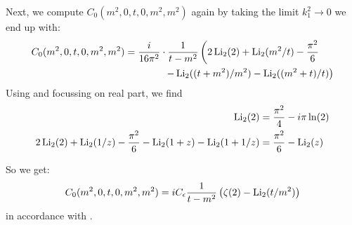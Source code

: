 Next, we compute $C_0(m^2,0,t,0,m^2,m^2)$ again by taking the limit $k_1^2\rightarrow 0$ we end up with:
\begin{align}
C_0(m^2,0,t,0,m^2,m^2) &= \frac{i}{16\pi^2}\cdot\frac 1{t-m^2}\left(2\operatorname{\text{Li}_2}(2) + \operatorname{\text{Li}_2}(m^2/t)-\frac{\pi^2}6\right.\nonumber\\
 &\hspace{40pt}\left.-\operatorname{\text{Li}_2}((t+m^2)/m^2)-\operatorname{\text{Li}_2}((m^2+t)/t)\right)
\end{align}
Using \cite{Zagier2007} and focussing on real part, we find
\begin{align}
\operatorname{\text{Li}_2}(2) &= \frac{\pi^2}4-i\pi\ln(2)\\
2\operatorname{\text{Li}_2}(2) + \operatorname{\text{Li}_2}(1/z)-\frac{\pi^2}6-\operatorname{\text{Li}_2}(1+z)-\operatorname{\text{Li}_2}(1+1/z) &=\frac{\pi^2}6-\operatorname{\text{Li}_2}(z)
\end{align}

So we get:
\begin{equation}
C_0(m^2,0,t,0,m^2,m^2)=iC_\epsilon\frac 1{t-m^2}\left(\zeta(2)-\operatorname{\text{Li}_2}(t/m^2)\right)
\end{equation}
in accordance with \cite{Bojak:2000eu}\cite{PhysRevD.40.54}.
